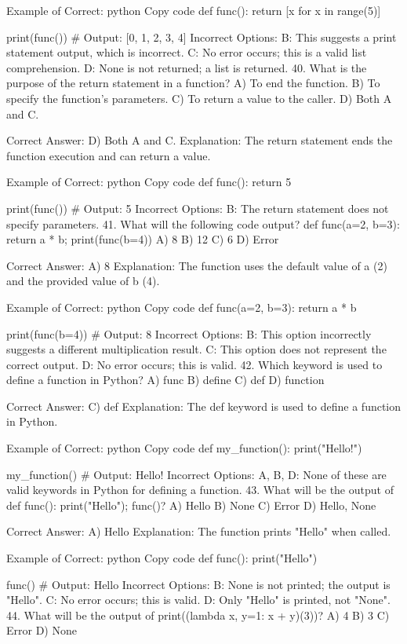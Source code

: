 Example of Correct:
python
Copy code
def func():
    return [x for x in range(5)]

print(func())  # Output: [0, 1, 2, 3, 4]
Incorrect Options:
B: This suggests a print statement output, which is incorrect.
C: No error occurs; this is a valid list comprehension.
D: None is not returned; a list is returned.
40. What is the purpose of the return statement in a function?
A) To end the function.
B) To specify the function's parameters.
C) To return a value to the caller.
D) Both A and C.

Correct Answer: D) Both A and C.
Explanation: The return statement ends the function execution and can return a value.

Example of Correct:
python
Copy code
def func():
    return 5

print(func())  # Output: 5
Incorrect Options:
B: The return statement does not specify parameters.
41. What will the following code output? def func(a=2, b=3): return a * b; print(func(b=4))
A) 8
B) 12
C) 6
D) Error

Correct Answer: A) 8
Explanation: The function uses the default value of a (2) and the provided value of b (4).

Example of Correct:
python
Copy code
def func(a=2, b=3):
    return a * b

print(func(b=4))  # Output: 8
Incorrect Options:
B: This option incorrectly suggests a different multiplication result.
C: This option does not represent the correct output.
D: No error occurs; this is valid.
42. Which keyword is used to define a function in Python?
A) func
B) define
C) def
D) function

Correct Answer: C) def
Explanation: The def keyword is used to define a function in Python.

Example of Correct:
python
Copy code
def my_function():
    print("Hello!")

my_function()  # Output: Hello!
Incorrect Options:
A, B, D: None of these are valid keywords in Python for defining a function.
43. What will be the output of def func(): print("Hello"); func()?
A) Hello
B) None
C) Error
D) Hello, None

Correct Answer: A) Hello
Explanation: The function prints "Hello" when called.

Example of Correct:
python
Copy code
def func():
    print("Hello")

func()  # Output: Hello
Incorrect Options:
B: None is not printed; the output is "Hello".
C: No error occurs; this is valid.
D: Only "Hello" is printed, not "None".
44. What will be the output of print((lambda x, y=1: x + y)(3))?
A) 4
B) 3
C) Error
D) None

